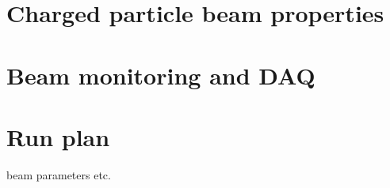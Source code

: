 
\section{Charged particle beam properties}

\section{Beam monitoring and DAQ}

\section{Run plan}

beam parameters etc.
